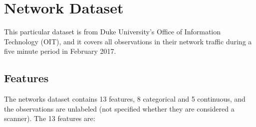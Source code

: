\documentclass[12pt,twoside]{dukestatscithesis}
\theoremstyle{definition}
\theoremstyle{definition}
\theoremstyle{definition}
\theoremstyle{remark}
\begin{document}
\section{Network Dataset}\label{network-dataset}

This particular dataset is from Duke University's Office of Information
Technology (OIT), and it covers all observations in their network
traffic during a five minute period in February 2017.

\subsection{Features}\label{features}

The networks dataset contains 13 features, 8 categorical and 5
continuous, and the observations are unlabeled (not specified whether
they are considered a scanner). The 13 features are:
\end{document}

